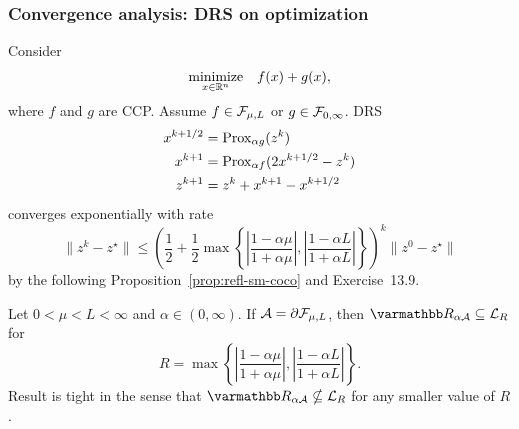 \documentclass[10pt,mathserif]{beamer}
\begin{document}
\begin{frame}
\frametitle{Convergence analysis: DRS on optimization}
Consider
\[
\begin{array}{ll}
\underset{x\in \mathbb{R}^n}{\mbox{minimize}}& f(x)+g(x),
\end{array}
\]
where $f$ and $g$ are CCP. Assume $f\in{\mathcal{F}}_{\mu,L}$ or $g\in{\mathcal{F}}_{0,\infty}$.
DRS
\begin{align*}
x^{k+1/2}&=\mathrm{Prox}_{\alpha  g}(z^k)\\
x^{k+1}&=\mathrm{Prox}_{\alpha  f}(2x^{k+1/2}-z^k)\\
z^{k+1}&=z^k+x^{k+1}-x^{k+1/2}
\end{align*}
converges exponentially with rate 
\begingroup\makeatletter\def\f@size{9}\check@mathfonts
\[
\|z^k-z^\star\|\le
\left(
\frac{1}{2}+\frac{1}{2}
\max\left\{
\left|\frac{1-\alpha\mu}{1+\alpha \mu}\right|,\left|\frac{1-\alpha L}{1+\alpha L}\right|
\right\}\right)^k
\|z^0-z^\star\|
\]
\endgroup
by the following Proposition~\ref{prop:refl-sm-coco} and Exercise~13.9.
\begin{proposition}
\label{prop:refl-cvx}
Let $0<\mu<L<\infty$ and $\alpha\in(0,\infty)$.
If ${\mathcal{A}}= \partial {\mathcal{F}}_{\mu,L}$, then 
$\opR_{\alpha \cA}\subseteq \cL_R$ for
\[
R=
\max\left\{
\left|\frac{1-\alpha\mu}{1+\alpha \mu}\right|,\left|\frac{1-\alpha L}{1+\alpha L}\right|
\right\}.
\]
Result is tight in the sense that $\opR_{\alpha \cA}\nsubseteq \cL_R$ for any smaller value of $R$.
\end{proposition}
\end{frame}
\end{document}

